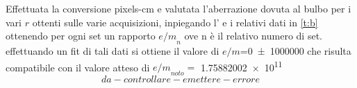 	Effettuata la conversione pixels-cm e valutata l'aberrazione dovuta al bulbo 
	per i vari $r$ ottenti sulle varie acquisizioni, inpiegando l' e i relativi dati in \tablename{ \ref{t:b}} ottenendo per ogni set un rapporto ${e/m}_{n}$ ove n è il relativo numero di set.
	effettuando un fit di tali dati si ottiene il valore di $e/m$=\SI{0\pm 1000000}{\frac{\coulomb}{\kilogram}}  che risulta compatibile con il valore atteso di ${e/m}_{noto}=$
	\SI{1.75882002 e11}{\frac{\coulomb}{\kilogram}} $$da-controllare-e mettere- errore$$
	
	
	
	
	
	
	
	
	
	
	
	
	
	
	
	
	
	
	
	
	
	
	
	
	